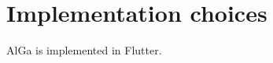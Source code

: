 \chapter{Implementation choices}
\label{chap:implementationChoices}
AlGa is implemented in Flutter.
